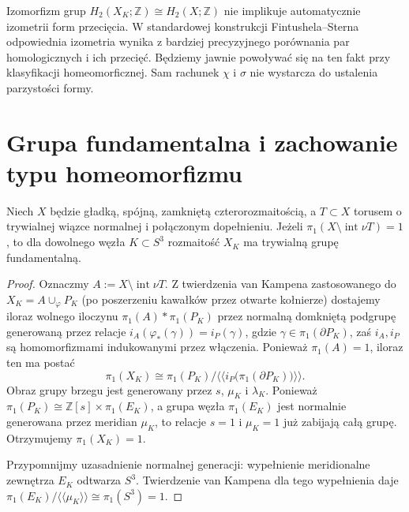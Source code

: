 \begin{uwaga}
Izomorfizm grup $H_2(X_K;\mathbb Z)\cong H_2(X;\mathbb Z)$
nie implikuje automatycznie izometrii form przecięcia.
W standardowej konstrukcji Fintushela--Sterna
odpowiednia izometria wynika z bardziej precyzyjnego
porównania par homologicznych i ich przecięć.
Będziemy jawnie powoływać się na ten fakt przy
klasyfikacji homeomorficznej. Sam rachunek $\chi$ i
$\sigma$ nie wystarcza do ustalenia parzystości formy.
\end{uwaga}

\section{Grupa fundamentalna i zachowanie typu homeomorfizmu}
\label{sec:tg-ks-pi1}

\begin{twierdzenie}
\label{thm:tg-ks-pi1}
Niech $X$ będzie gładką, spójną, zamkniętą
czterorozmaitością, a $T\subset X$ torusem o
trywialnej wiązce normalnej i połączonym dopełnieniu.
Jeżeli $\pi_1(X\setminus\operatorname{int}\nu T)=1$,
to dla dowolnego węzła $K\subset S^3$
rozmaitość $X_K$ ma trywialną grupę fundamentalną.
\end{twierdzenie}

\begin{proof}
Oznaczmy $A:=X\setminus\operatorname{int}\nu T$.
Z twierdzenia van Kampena zastosowanego do
$X_K=A\cup_\varphi P_K$ (po poszerzeniu kawałków
przez otwarte kołnierze) dostajemy iloraz wolnego
iloczynu $\pi_1(A)*\pi_1(P_K)$ przez normalną
domkniętą podgrupę generowaną przez relacje
$i_A(\varphi_*(\gamma))=i_P(\gamma)$,
gdzie $\gamma\in\pi_1(\partial P_K)$, zaś $i_A,i_P$
są homomorfizmami indukowanymi przez włączenia.
Ponieważ $\pi_1(A)=1$, iloraz ten ma postać
\[
\pi_1(X_K)\cong
\pi_1(P_K)\big/\langle\!\langle
  i_P\bigl(\pi_1(\partial P_K)\bigr)
\rangle\!\rangle.
\]
Obraz grupy brzegu jest generowany przez $s$, $\mu_K$
i $\lambda_K$. Ponieważ
$\pi_1(P_K)\cong\mathbb Z[s]\times\pi_1(E_K)$,
a grupa węzła $\pi_1(E_K)$ jest normalnie generowana
przez meridian $\mu_K$, to relacje $s=1$ i
$\mu_K=1$ już zabijają całą grupę. Otrzymujemy
$\pi_1(X_K)=1$.

Przypomnijmy uzasadnienie normalnej generacji:
wypełnienie meridionalne zewnętrza $E_K$
odtwarza $S^3$. Twierdzenie van Kampena dla tego
wypełnienia daje
$\pi_1(E_K)/\langle\!\langle\mu_K\rangle\!\rangle
\cong\pi_1(S^3)=1$.
\end{proof}

